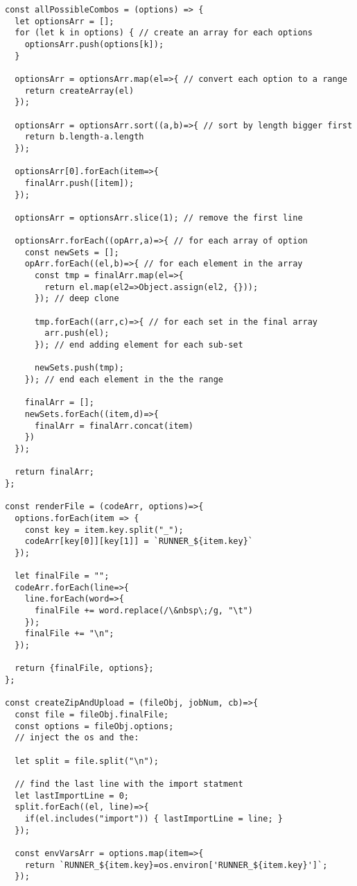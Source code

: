 \documentclass[12pt,oneside]{amsart}
\begin{document}
\begin{Verbatim}[fontsize=\tiny, frame=single]
const allPossibleCombos = (options) => {
  let optionsArr = [];
  for (let k in options) { // create an array for each options
    optionsArr.push(options[k]);
  }

  optionsArr = optionsArr.map(el=>{ // convert each option to a range
    return createArray(el)
  });

  optionsArr = optionsArr.sort((a,b)=>{ // sort by length bigger first
    return b.length-a.length
  });

  optionsArr[0].forEach(item=>{
    finalArr.push([item]);
  });

  optionsArr = optionsArr.slice(1); // remove the first line

  optionsArr.forEach((opArr,a)=>{ // for each array of option
    const newSets = [];
    opArr.forEach((el,b)=>{ // for each element in the array
      const tmp = finalArr.map(el=>{
        return el.map(el2=>Object.assign(el2, {}));
      }); // deep clone

      tmp.forEach((arr,c)=>{ // for each set in the final array
        arr.push(el);
      }); // end adding element for each sub-set

      newSets.push(tmp);
    }); // end each element in the the range

    finalArr = [];
    newSets.forEach((item,d)=>{
      finalArr = finalArr.concat(item)
    })
  });

  return finalArr;
};

const renderFile = (codeArr, options)=>{
  options.forEach(item => {
    const key = item.key.split("_");
    codeArr[key[0]][key[1]] = `RUNNER_${item.key}`
  });

  let finalFile = "";
  codeArr.forEach(line=>{
    line.forEach(word=>{
      finalFile += word.replace(/\&nbsp\;/g, "\t")
    });
    finalFile += "\n";
  });

  return {finalFile, options};
};

const createZipAndUpload = (fileObj, jobNum, cb)=>{
  const file = fileObj.finalFile;
  const options = fileObj.options;
  // inject the os and the:

  let split = file.split("\n");

  // find the last line with the import statment
  let lastImportLine = 0;
  split.forEach((el, line)=>{
    if(el.includes("import")) { lastImportLine = line; }
  });

  const envVarsArr = options.map(item=>{
    return `RUNNER_${item.key}=os.environ['RUNNER_${item.key}']`;
  });


\end{Verbatim}
\end{document}
